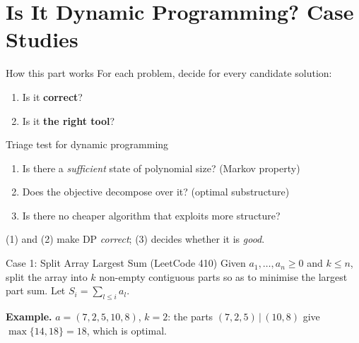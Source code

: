 \section{Is It Dynamic Programming? Case Studies}

\begin{frame}{How this part works}
	For each problem, decide for every candidate solution:
	\begin{enumerate}
		\item Is it \textbf{correct}?
		\item Is it \textbf{the right tool}?
	\end{enumerate}
\end{frame}

\begin{frame}{Triage test for dynamic programming}
	\begin{enumerate}
		\item Is there a \emph{sufficient} state of polynomial size? (Markov property)
		\item Does the objective decompose over it? (optimal substructure)
		\item Is there no cheaper algorithm that exploits more structure?
	\end{enumerate}

	\seprule

	(1) and (2) make DP \emph{correct}; (3) decides whether it is \emph{good}.
\end{frame}

\begin{frame}{Case 1: Split Array Largest Sum (LeetCode 410)}
	Given $a_1,\dots,a_n\ge 0$ and $k\le n$, split the array into $k$ non-empty
	contiguous parts so as to \alert{minimise the largest part sum}. Let $S_i=\sum_{l\le i}a_l$.

	\seprule

	\textbf{Example.} $a=(7,2,5,10,8)$, $k=2$: the parts $(7,2,5)\,|\,(10,8)$ give $\max\{14,18\}=18$, which is optimal.
\end{frame}

